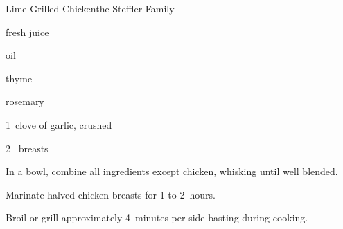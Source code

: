 \begin{recipe}{Lime Grilled Chicken}{the Steffler Family}{}

\begin{ingredients}
\item \C{\half} fresh  juice
\item \C{\quarter} oil
\item {} 
\item {} thyme
\item {} rosemary
\item 1~clove of garlic, crushed
\item 2~ breasts
\end{ingredients}

\begin{directions}
\item In a bowl, combine all ingredients except chicken, whisking until well blended.
\item Marinate halved chicken breasts for 1 to 2~hours.
\item Broil or grill approximately 4~minutes per side basting during cooking.
\end{directions}
\end{recipe}
